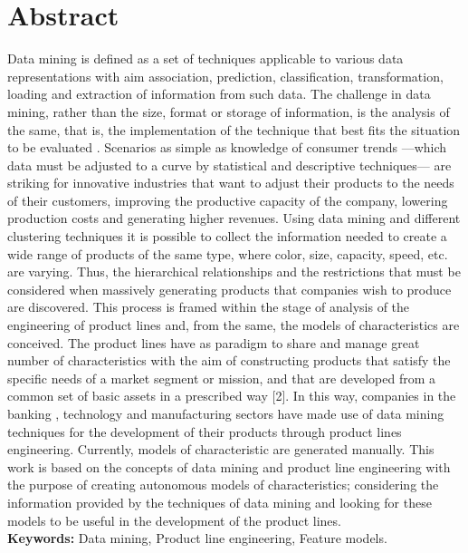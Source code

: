 \chapter*{Abstract}

Data mining is defined as a set of techniques applicable to various data representations with aim association, prediction, classification, transformation, loading and extraction of information from such data. The challenge in data mining, rather than the size, format or storage of information, is the analysis of the same, that is, the implementation of the technique that best fits the situation to be evaluated \cite{Izenman2006}. Scenarios as simple as knowledge of consumer trends —which data must be adjusted to a curve by statistical and descriptive techniques— are striking for innovative industries that want to adjust their products to the needs of their customers, improving the productive capacity of the company, lowering production costs and generating higher revenues.
Using data mining and different clustering techniques it is possible to collect the information needed to create a wide range of products of the same type, where color, size, capacity, speed, etc. are varying. Thus, the hierarchical relationships and the restrictions that must be considered when massively generating products that companies wish to produce are discovered. This process is framed within the stage of analysis of the engineering of product lines and, from the same, the models of characteristics are conceived. The product lines have as paradigm to share and manage great number of characteristics with the aim of constructing products that satisfy the specific needs of a market segment or mission, and that are developed from a common set of basic assets in a prescribed way [2]. In this way, companies in the banking \cite{Koutanaei2015}, technology \cite{Lin2013} and manufacturing \cite{Bae2011} sectors have made use of data mining techniques for the development of their products through product lines engineering.
Currently, models of characteristic are generated manually. This work is based on the concepts of data mining and product line engineering with the purpose of creating autonomous models of characteristics; considering the information provided by the techniques of data mining and looking for these models to be useful in the development of the product lines.
\\
\textbf{Keywords:}
Data mining, Product line engineering, Feature models.